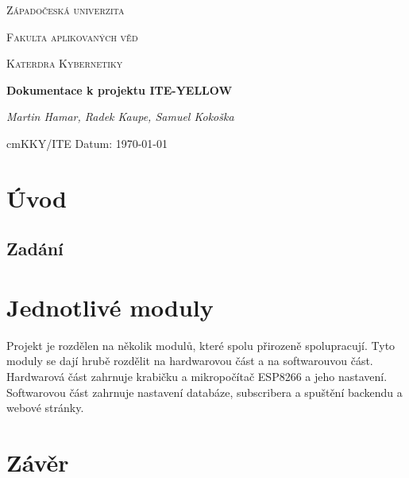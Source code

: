 \documentclass{article}
\begin{document}
	
	
	\begin{titlepage}
		
		\centering
		
		{\scshape\LARGE Západočeská univerzita\par}
		{\scshape\Large Fakulta aplikovaných věd \par}
		{\scshape\Large Katerdra Kybernetiky \par}
		
		{\huge\bfseries Dokumentace k projektu ITE-YELLOW\par} %
		
		\vspace{2cm}
		
		{\Large\itshape Martin Hamar, Radek Kaupe, Samuel Kokoška\par}
		
		\vfill
		
		\vspace{1cm}
		
		 cm{KKY/ITE} \hfill {Datum: \today }
		
		
		
	\end{titlepage}
	
	\section{Úvod}
	
	
	\subsection{Zadání}
	
	
	\section{Jednotlivé moduly}
		Projekt je rozdělen na několik modulů, které spolu přirozeně spolupracují. Tyto moduly se dají hrubě rozdělit na hardwarovou část a na softwarouvou část.
		Hardwarová část zahrnuje krabičku a mikropočítač ESP8266 a jeho nastavení. Softwarovou část zahrnuje nastavení databáze, subscribera a spuštění backendu a webové stránky.
	
	
	
	
	
		
	\section{Závěr}
\end{document}
